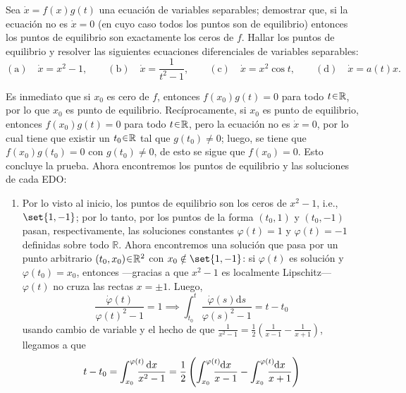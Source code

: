 \begin{ejer}
Sea $\dot{x} = f(x) g(t)$ una ecuación de variables separables; demostrar que,
si la ecuación no es $\dot{x} = 0$ (en cuyo caso todos los puntos son de
equilibrio) entonces los puntos de equilibrio son exactamente los ceros
de $f$. Hallar los puntos de equilibrio y resolver las siguientes ecuaciones
diferenciales de variables separables:
\[
    (\text{a})\quad \dot{x} = x^2 - 1, \qquad
    (\text{b})\quad \dot{x} = \frac{1}{t^2 - 1}, \qquad
    (\text{c})\quad \dot{x} = x^2 \cos t, \qquad
    (\text{d})\quad \dot{x} = a(t)x.
\]
\end{ejer}
\begin{sol}
Es inmediato que si $x_0$ es cero de $f$, entonces $f(x_0)g(t) = 0$ para todo $t \en \mathbb{R}$, por lo que $x_0$ es punto de equilibrio. Recíprocamente, si $x_0$ es punto de equilibrio, entonces $f(x_0)g(t) = 0$ para todo $t \en \mathbb{R}$, pero la ecuación no es $\dot{x} = 0$, por lo cual tiene que existir un $t_0 \en \mathbb{R}$ tal que $g(t_0) \neq 0$; luego, se tiene que $f(x_0)g(t_0) = 0$ con $g(t_0) \neq 0$, de esto se sigue que $f(x_0) = 0$. Esto concluye la prueba. Ahora encontremos los puntos de equilibrio y las soluciones de cada EDO:
\begin{enumerate}[label = (\alph*)]
    \item Por lo visto al inicio, los puntos de equilibrio son los ceros de $x^2 -1$, i.e., $\set{1,-1}$; por lo tanto, por los puntos de la forma $(t_0, 1)$ y $(t_0, -1)$ pasan, respectivamente, las soluciones constantes $\varphi(t) = 1$ y $\varphi(t) = -1$ definidas sobre todo $\mathbb{R}$. Ahora encontremos una solución que pasa por un punto arbitrario $(t_0, x_0) \en \mathbb{R}^2$ con $x_0 \notin \set{1,-1}$: si $\varphi(t)$ es solución y $\varphi(t_0) = x_0$, entonces ---gracias a que $x^2 - 1$ es localmente Lipschitz--- $\varphi(t)$ no cruza las rectas $x = \pm 1$. Luego,
    \[
        \frac{\dot{\varphi}(t)}{\varphi(t)^2 - 1} = 1%
        \implies%
        \int^t_{t_0} \frac{\dot\varphi(s) \mathrm{d}s}{\varphi(s)^2 - 1} = t - t_0
    \]
    usando cambio de variable y el hecho de que $\frac{1}{x^2 - 1} = \frac12\left(\frac{1}{x-1} - \frac{1}{x+1}\right)$, llegamos a que 
    \begin{align*}
        t - t_0%
        &= \int^{\varphi\mathrlap{(t)}}_{{x_0}} \frac{\mathrm{d}x}{x^2 - 1}%
        = \frac12 \left(%
            \int^{\varphi\mathrlap{(t)}}_{{x_0}} \frac{\mathrm{d}x}{x - 1} - \int^{\varphi\mathrlap{(t)}}_{{x_0}} \frac{\mathrm{d}x}{x + 1}
        \right)\\

\end{align*}
\end{enumerate}
\end{sol}
